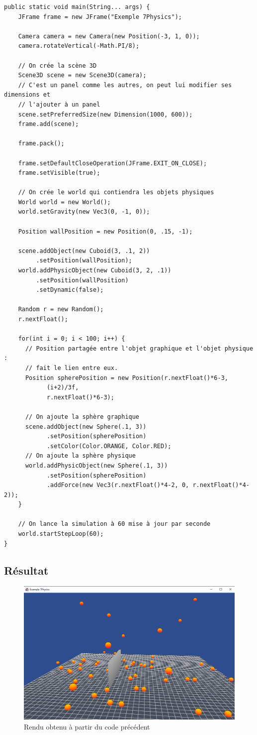\documentclass[11pt]{report}
\begin{document}
\begin{verbatim}
public static void main(String... args) {
    JFrame frame = new JFrame("Exemple 7Physics");

    Camera camera = new Camera(new Position(-3, 1, 0));
    camera.rotateVertical(-Math.PI/8);

    // On crée la scène 3D
    Scene3D scene = new Scene3D(camera);
    // C'est un panel comme les autres, on peut lui modifier ses dimensions et
    // l'ajouter à un panel
    scene.setPreferredSize(new Dimension(1000, 600));
    frame.add(scene);

    frame.pack();

    frame.setDefaultCloseOperation(JFrame.EXIT_ON_CLOSE);
    frame.setVisible(true);

    // On crée le world qui contiendra les objets physiques
    World world = new World();
    world.setGravity(new Vec3(0, -1, 0));

    Position wallPosition = new Position(0, .15, -1);

    scene.addObject(new Cuboid(3, .1, 2))
         .setPosition(wallPosition);
    world.addPhysicObject(new Cuboid(3, 2, .1))
         .setPosition(wallPosition)
         .setDynamic(false);

    Random r = new Random();
    r.nextFloat();

    for(int i = 0; i < 100; i++) {
      // Position partagée entre l'objet graphique et l'objet physique :
      // fait le lien entre eux.
      Position spherePosition = new Position(r.nextFloat()*6-3,
            (i+2)/3f,
            r.nextFloat()*6-3);

      // On ajoute la sphère graphique
      scene.addObject(new Sphere(.1, 3))
            .setPosition(spherePosition)
            .setColor(Color.ORANGE, Color.RED);
      // On ajoute la sphère physique
      world.addPhysicObject(new Sphere(.1, 3))
            .setPosition(spherePosition)
            .addForce(new Vec3(r.nextFloat()*4-2, 0, r.nextFloat()*4-2));
    }

    // On lance la simulation à 60 mise à jour par seconde
    world.startStepLoop(60);
}

\end{verbatim}

\subsection{Résultat}

\begin{figure}[h]
  \centering
  \includegraphics[width=15cm]{./example.png}
  \caption{Rendu obtenu à partir du code précédent}
\end{figure}
\end{document}

